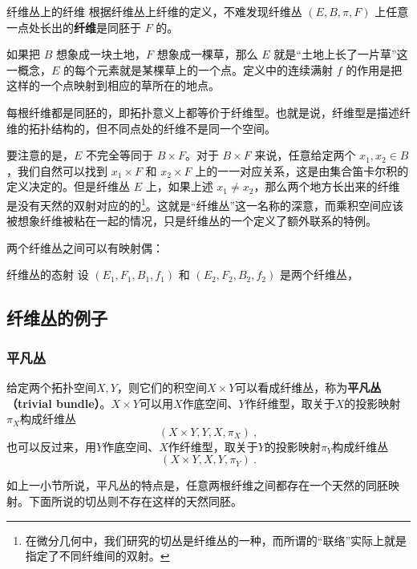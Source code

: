 \begin{corollary}{纤维丛上的纤维}
根据纤维丛上纤维的定义，不难发现纤维丛 $(E, B, \pi, F)$ 上任意一点处长出的\textbf{纤维}是同胚于 $F$ 的。
\end{corollary}

如果把 $B$ 想象成一块土地，$F$ 想象成一棵草，那么 $E$ 就是“土地上长了一片草”这一概念，$E$ 的每个元素就是某棵草上的一个点。定义中的连续满射 $f$ 的作用是把这样的一个点映射到相应的草所在的地点。

每根纤维都是同胚的，即拓扑意义上都等价于纤维型。也就是说，纤维型是描述纤维的拓扑结构的，但不同点处的纤维不是同一个空间。

要注意的是，$E$ 不完全等同于 $B\times F$。对于 $B\times F$ 来说，任意给定两个 $x_1, x_2\in B$，我们自然可以找到 $x_1\times F$ 和 $x_2\times F$ 上的一一对应关系，这是由集合笛卡尔积的定义决定的。但是纤维丛 $E$ 上，如果上述 $x_1\not=x_2$，那么两个地方长出来的纤维是没有天然的双射对应的的\footnote{在微分几何中，我们研究的切丛是纤维丛的一种，而所谓的“联络”实际上就是指定了不同纤维间的双射。}。这就是“纤维丛”这一名称的深意，而乘积空间应该被想象纤维被粘在一起的情况，只是纤维丛的一个定义了额外联系的特例。

两个纤维丛之间可以有映射偶：

\begin{definition}{纤维丛的态射}
设 $(E_1, F_1, B_1, f_1)$ 和 $(E_2, F_2, B_2, f_2)$ 是两个纤维丛，
\end{definition}


\subsection{纤维丛的例子}

\subsubsection{平凡丛}


给定两个拓扑空间$X, Y$，则它们的积空间$X\times Y$可以看成纤维丛，称为\textbf{平凡丛（trivial bundle）}。$X\times Y$可以用$X$作底空间、$Y$作纤维型，取关于$X$的投影映射$\pi_X$构成纤维丛
\begin{equation}
(X\times Y, Y, X, \pi_X)~, 
\end{equation}
也可以反过来，用$Y$作底空间、$X$作纤维型，取关于$Y$的投影映射$\pi_Y$构成纤维丛
\begin{equation}
(X\times Y, X, Y, \pi_Y)~. 
\end{equation}


如上一小节所说，平凡丛的特点是，任意两根纤维之间都存在一个天然的同胚映射。下面所说的切丛则不存在这样的天然同胚。


